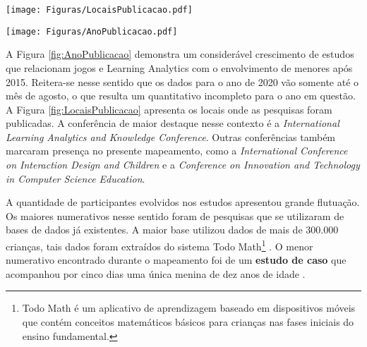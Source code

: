 \documentclass[12pt]{article}
\begin{document}
\begin{figure*}[!htb]
    \centering
    \begin{minipage}{.5\textwidth}
        \centering
        \texttt{[image: Figuras/LocaisPublicacao.pdf]}
        \caption{Separação dos artigos por local de publicação}\label{fig:LocaisPublicacao}
    \end{minipage}%
    \begin{minipage}{0.5\textwidth}
        \centering
        \texttt{[image: Figuras/AnoPublicacao.pdf]}
        \caption{Quantidade de artigos por ano de publicação}\label{fig:AnoPublicacao}
    \end{minipage}
\end{figure*}


A Figura \ref{fig:AnoPublicacao} demonstra um considerável crescimento de estudos que relacionam jogos e Learning Analytics com o envolvimento de menores após 2015. Reitera-se nesse sentido que os dados para o ano de 2020 vão somente até o mês de agosto, o que resulta um quantitativo incompleto para o ano em questão. A Figura \ref{fig:LocaisPublicacao} apresenta os locais onde as pesquisas foram publicadas. A conferência de maior destaque nesse contexto é a \textit{International Learning Analytics and Knowledge Conference}. Outras conferências também marcaram presença no presente mapeamento, como a \textit{International Conference on Interaction Design and Children} e a \textit{Conference on Innovation and Technology in Computer Science Education}.

A quantidade de participantes evolvidos nos estudos apresentou grande flutuação. Os maiores numerativos nesse sentido foram de pesquisas que se utilizaram de bases de dados já existentes. A maior base utilizou dados de mais de 300.000 crianças, tais dados foram extraídos do sistema Todo Math\footnote{Todo Math é um aplicativo de aprendizagem baseado em dispositivos móveis que contém conceitos matemáticos básicos para crianças nas fases iniciais do ensino fundamental.} \cite{kim2018ll}. O menor numerativo encontrado durante o mapeamento foi de um \textbf{estudo de caso} que acompanhou por cinco dias uma única menina de dez anos de idade \cite{pantic2016studying}. 
\end{document}
